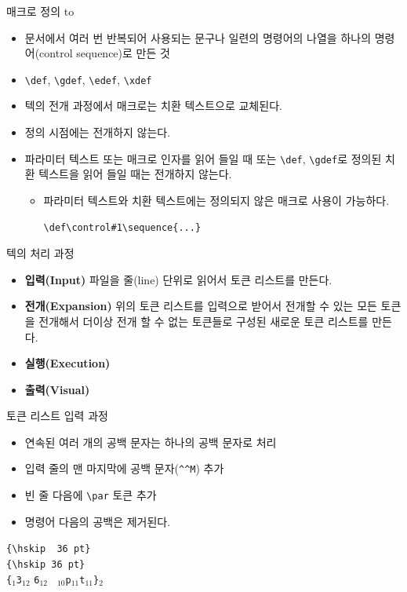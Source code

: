 \documentclass{beamer}
\begin{document}
%
\begin{frame}[fragile]{매크로 정의}
  \medskip
  \hbox to
  \smallskip
  \begin{itemize}
  \item 문서에서 여러 번 반복되어 사용되는 문구나 일련의 명령어의 나열을 하나의
    명령어(control sequence)로 만든 것
  \item \verb+\def+, \verb+\gdef+, \verb+\edef+, \verb+\xdef+
  \item 텍의 전개 과정에서 매크로는 치환 텍스트으로 교체된다.
  \item 정의 시점에는 전개하지 않는다.
  \item 파라미터 텍스트 또는 매크로 인자를 읽어 들일 때 또는 \verb+\def+,
    \verb+\gdef+로 정의된 치환 텍스트을 읽어 들일 때는 전개하지 않는다.
    \begin{itemize}
    \item 파라미터 텍스트와 치환 텍스트에는 정의되지 않은 매크로 사용이 가능하다.
    
      \verb+\def\control#1\sequence{...}+
    \end{itemize}
  \end{itemize}
\end{frame}


%
\begin{frame}{텍의 처리 과정}  
  \begin{itemize}
  \item \alert{\bf 입력(Input)} 파일을 줄(line) 단위로 읽어서
    \alert{토큰 리스트}를 만든다.
  \item \alert{\bf 전개(Expansion)} 위의 토큰 리스트를 입력으로 받어서 전개할 수 있는
    모든 토큰을 전개해서 더이상 전개 할 수 없는 토큰들로 구성된 새로운 토큰 리스트를 만든다.
  \item \alert{\bf 실행(Execution)}
  \item \alert{\bf 출력(Visual)}
  \end{itemize}
\end{frame}


%
\begin{frame}[fragile]{토큰 리스트}
  \alert{입력 과정}

  \begin{itemize}
  \item 연속된 여러 개의 공백 문자는 하나의 공백 문자로 처리
  \item 입력 줄의 맨 마지막에 공백 문자(\verb+^^M+) 추가
  \item 빈 줄 다음에 \verb+\par+ 토큰 추가
  \item 명령어 다음의 공백은 제거된다.
  \end{itemize}
  
  \verb*+{\hskip  36 pt}+\\
  \verb*+{\hskip 36 pt}+\\
  \bigskip
  \verb|{|$_1$\quad{}\quad\verb|3|$_{12}$
  \quad\verb|6|$_{12}$\quad
  \verb*| |$_{10}$\quad\verb|p|$_{11}$\quad\verb|t|$_{11}$\quad\verb|}|$_{2}$
\end{frame}
\end{document}
